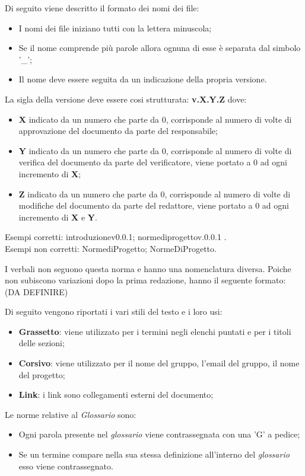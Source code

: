 Di seguito viene descritto il formato dei nomi dei file:
\begin{itemize}
\item I nomi dei file iniziano tutti con la lettera minuscola;
\item Se il nome comprende più parole allora ognuna di esse è separata dal simbolo '\_';
\item Il nome deve essere seguita da un indicazione della propria versione.
\end {itemize}
La sigla della versione deve essere cosi strutturata: \textbf{v.X.Y.Z} dove:
\begin{itemize}
\item \textbf{X} indicato da un numero che parte da 0, corrisponde al numero di volte di approvazione del documento da parte del responsabile;
\item \textbf{Y} indicato da un numero che parte da 0, corrisponde al numero di volte di verifica del documento da parte del verificatore, viene portato a 0 ad ogni incremento di \textbf{X};
\item \textbf{Z} indicato da un numero che parte da 0, corrisponde al numero di volte di modifiche del documento da parte del redattore, viene portato a 0 ad ogni incremento di \textbf{X} e \textbf{Y}.
\end {itemize}
Esempi corretti: introduzione\textunderscore v0.0.1; norme\textunderscore di\textunderscore progetto\textunderscore v.0.0.1 .\\
Esempi non corretti: Norme\textunderscore di\textunderscore Progetto; NormeDiProgetto.

I verbali non seguono questa norma e hanno una nomenclatura diversa. Poiche non subiscono variazioni dopo la prima redazione, hanno il seguente formato: (DA DEFINIRE)

Di seguito vengono riportati i vari stili del testo e i loro usi:
\begin {itemize}
\item \textbf{Grassetto}: viene utilizzato per i termini negli elenchi puntati e per i titoli delle sezioni;
\item \textbf{Corsivo}: viene utilizzato per il nome del gruppo, l'email del gruppo, il nome del progetto;
\item \textbf{Link}: i link sono collegamenti esterni del documento;
\end {itemize}

Le norme relative al \textit{Glossario} sono:
\begin{itemize}
    \item Ogni parola presente nel \textit{glossario} viene contrassegnata con una 'G' a pedice;
    \item Se un termine compare nella sua stessa definizione all'interno del \textit{glossario} esso viene contrassegnato.
\end{itemize}

